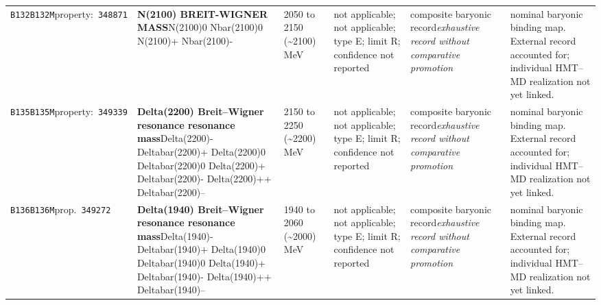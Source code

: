 \begin{landscape}
\begin{longtable}{L{1.85cm}L{4.45cm}L{2.35cm}L{4.05cm}L{3.35cm}L{7.15cm}}
\texttt{B132}\newline \texttt{B132M}\newline property:\ \texttt{348871} & \textbf{N(2100) BREIT-WIGNER MASS}\newline N(2100)0 \textbar{}\allowbreak{} Nbar(2100)0 \textbar{}\allowbreak{} N(2100)+ \textbar{}\allowbreak{} Nbar(2100)- & 2050 to 2150 (\textasciitilde{}2100)\,MeV & not applicable; not applicable; type E; limit R; confidence not reported & composite baryonic record\newline \emph{exhaustive record without comparative promotion} & nominal baryonic binding map. External record accounted for; individual HMT--MD realization not yet linked. \\
\texttt{B135}\newline \texttt{B135M}\newline property:\ \texttt{349339} & \textbf{Delta(2200) Breit--Wigner resonance resonance mass}\newline Delta(2200)- \textbar{}\allowbreak{} Deltabar(2200)+ \textbar{}\allowbreak{} Delta(2200)0 \textbar{}\allowbreak{} Deltabar(2200)0 \textbar{}\allowbreak{} Delta(2200)+ \textbar{}\allowbreak{} Deltabar(2200)- \textbar{}\allowbreak{} Delta(2200)++ \textbar{}\allowbreak{} Deltabar(2200)-- & 2150 to 2250 (\textasciitilde{}2200)\,MeV & not applicable; not applicable; type E; limit R; confidence not reported & composite baryonic record\newline \emph{exhaustive record without comparative promotion} & nominal baryonic binding map. External record accounted for; individual HMT--MD realization not yet linked. \\
\texttt{B136}\newline \texttt{B136M}\newline prop.\ \texttt{349272} & \textbf{Delta(1940) Breit--Wigner resonance resonance mass}\newline Delta(1940)- \textbar{}\allowbreak{} Deltabar(1940)+ \textbar{}\allowbreak{} Delta(1940)0 \textbar{}\allowbreak{} Deltabar(1940)0 \textbar{}\allowbreak{} Delta(1940)+ \textbar{}\allowbreak{} Deltabar(1940)- \textbar{}\allowbreak{} Delta(1940)++ \textbar{}\allowbreak{} Deltabar(1940)-- & 1940 to 2060 (\textasciitilde{}2000)\,MeV & not applicable; not applicable; type E; limit R; confidence not reported & composite baryonic record\newline \emph{exhaustive record without comparative promotion} & nominal baryonic binding map. External record accounted for; individual HMT--MD realization not yet linked. \\

\end{longtable}
\end{landscape}
